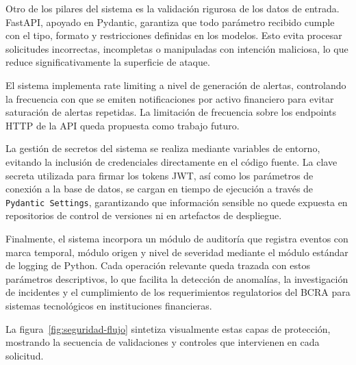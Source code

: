   Otro de los pilares del sistema es la validación rigurosa de los datos de entrada.
  FastAPI, apoyado en Pydantic, garantiza que todo parámetro recibido cumple con el
  tipo, formato y restricciones definidas en los modelos. Esto evita procesar
  solicitudes incorrectas, incompletas o manipuladas con intención maliciosa, lo que
  reduce significativamente la superficie de ataque.

  El sistema implementa rate limiting a nivel de generación de alertas, controlando
  la frecuencia con que se emiten notificaciones por activo financiero para evitar
  saturación de alertas repetidas. La limitación de frecuencia sobre los endpoints
  HTTP de la API queda propuesta como trabajo futuro.

  La gestión de secretos del sistema se realiza mediante variables de entorno,
  evitando la inclusión de credenciales directamente en el código fuente. La clave
  secreta utilizada para firmar los tokens JWT, así como los parámetros de conexión
  a la base de datos, se cargan en tiempo de ejecución a través de \texttt{Pydantic
  Settings}, garantizando que información sensible no quede expuesta en repositorios
  de control de versiones ni en artefactos de despliegue.

Finalmente, el sistema incorpora un módulo de auditoría que registra eventos
  con marca temporal, módulo origen y nivel de severidad mediante el módulo
  estándar de logging de Python. Cada operación relevante queda trazada con
  estos parámetros descriptivos, lo que facilita la detección de anomalías, la
  investigación de incidentes y el cumplimiento de los requerimientos regulatorios
  del BCRA para sistemas tecnológicos en instituciones financieras.

La figura~\ref{fig:seguridad-flujo} sintetiza visualmente estas capas de
  protección, mostrando la secuencia de validaciones y controles que intervienen en
  cada solicitud.

